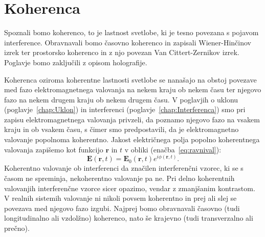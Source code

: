 
\chapter{Koherenca}
\label{chap:Koherenca}
Spoznali bomo koherenco, to je lastnost svetlobe, ki je tesno povezana
s pojavom interference. Obravnavali bomo časovno koherenco in zapisali 
Wiener-Hinčinov izrek ter prostorsko koherenco in z njo povezan 
Van Cittert-Zernikov izrek. Poglavje bomo zaključili z opisom holografije.

Koherenca oziroma koherentne lastnosti svetlobe se nanašajo na obstoj povezave
med fazo elektromagnetnega valovanja na nekem kraju ob nekem času ter njegovo 
fazo na nekem drugem kraju ob nekem drugem času. V poglavjih o 
uklonu (poglavje~\ref{chap:Uklon}) in interferenci (poglavje~\ref{chap:Interferenca})
smo pri zapisu elektromagnetnega valovanja privzeli, da poznamo njegovo fazo 
na vsakem kraju in ob vsakem času, s čimer smo predpostavili, 
da je elektromagnetno valovanje popolnoma koherentno. Jakost 
električnega polja popolno koherentnega valovanja zapišemo kot funkcijo $\mathbf{r}$ in $t$ 
v obliki (enačba~\ref{eq:ravnival}):
\begin{equation}
\mathbf{E} (\mathbf{r}, t) = \mathbf{E}_0(\mathbf{r}, t) 
e^{i\phi(\mathbf{r}, t)}.
\label{eq:08_01}
\end{equation}
Koherentno valovanje ob interferenci da značilen interferenčni 
vzorec, ki se s časom ne spreminja, nekoherentno valovanje pa ne. Pri  
delno koherentnih valovanjih interferenčne vzorce sicer opazimo, vendar z zmanjšanim
kontrastom. V realnih sistemih valovanje
ni nikoli povsem koherentno in prej ali slej se povezava med njegovo 
fazo izgubi. Najprej bomo obravnavali časovno (tudi longitudinalno ali vzdolžno) koherenco, 
nato še krajevno (tudi transverzalno ali prečno). 


